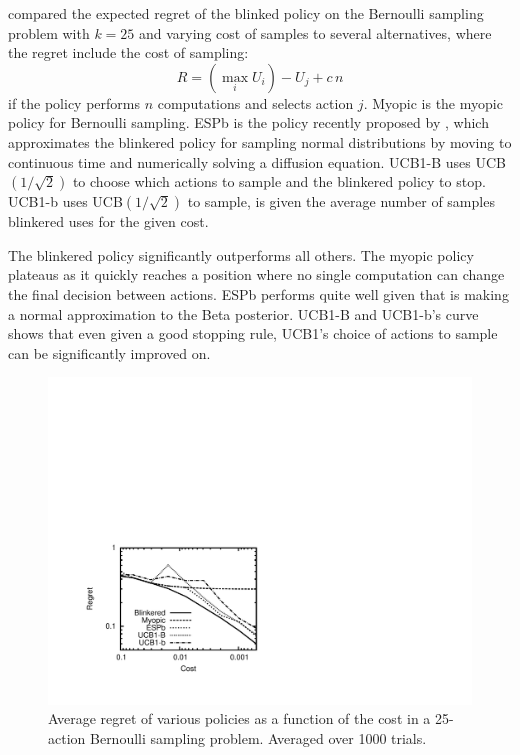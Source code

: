  compared the expected regret of the blinked policy on the 
Bernoulli sampling problem with $k=25$ and varying cost of samples to several 
alternatives, where the regret include the cost of sampling:
\[
	R = (\max_i U_i) - U_j + c\,n
\]
if the policy performs $n$ computations and selects action $j$.
Myopic is the myopic policy for Bernoulli sampling. ESPb is the 
policy recently proposed by \citet{Chick+Frazier:2011}, which approximates the 
blinkered policy for sampling normal distributions by moving to continuous time
and numerically solving a diffusion equation.  UCB1-B uses UCB$(1/\sqrt2)$ \cite{Auer+et+al:2002} to
choose which actions to sample and the blinkered policy to stop.  UCB1-b uses
UCB$(1/\sqrt2)$ to sample, is given the average number of samples blinkered
uses for the given cost.

The blinkered policy significantly outperforms all others.  The myopic policy
plateaus as it quickly reaches a position where no single computation can
change the final decision between actions.  ESPb performs quite well given
that is making a normal approximation to the Beta posterior.  
UCB1-B and UCB1-b's curve shows that even given a good stopping rule, UCB1's
choice of actions to sample can be significantly improved on.


\begin{figure}[htb]
\centering
\includegraphics[scale=0.7, trim=90 70 400 300]{blinkered-regret.pdf}
\caption{Average regret of various policies as a function of the cost in 
a 25-action Bernoulli sampling problem.  Averaged over 1000 trials.}
\label{fig:blinkered}
\end{figure}

